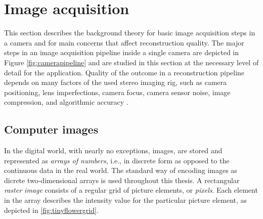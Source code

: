 


\section{Image acquisition} \label{sec:image-acquisition}




This section describes the background theory for basic image acquisition steps in a camera and for main concerns that affect reconstruction quality.
The major steps in an image acquisition pipeline inside a single camera are depicted in Figure \ref{fig:camerapipeline} and are studied in this section at the necessary level of detail for the application.
Quality of the outcome in a reconstruction pipeline depends on many factors of the used stereo imaging rig, such as camera positioning, lens imperfections, camera focus, camera sensor noise, image compression, and algorithmic accuracy \cite{hollsten2013imagequality,kyto2011method,rieke2009evaluation}.



\subsection{Computer images} \label{sec:computer-images}

In the digital world, with nearly no exceptions, images, are stored and represented as \emph{arrays of numbers}, i.e., in discrete form as opposed to the continuous data in the real world.
The standard way of encoding images as dicrete two-dimensional arrays is used throughout this thesis.
A rectangular \emph{raster image} consists of a regular grid of picture elements, or \emph{pixels}.
Each element in the array describes the intensity value for the particular picture element, as depicted in \ref{fig:tinyflowergrid}.
\cite[ch. 2.2]{trucco1998introductory}

